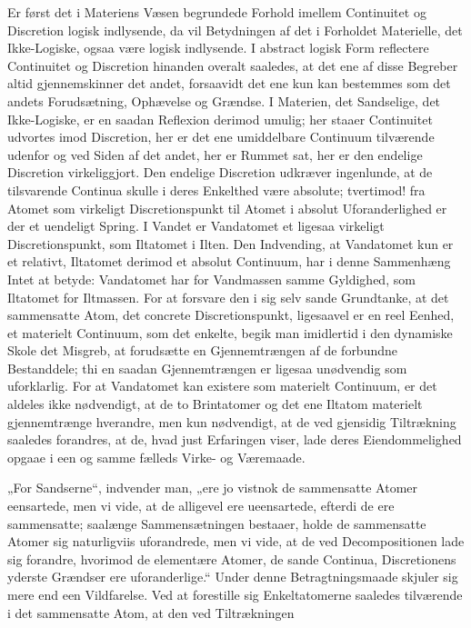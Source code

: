 \documentclass[12pt,a4paper]{book}
\begin{document}
Er først det i Materiens Væsen begrundede Forhold
imellem Continuitet og Discretion logisk indlysende, da vil
Betydningen af det i Forholdet Materielle, det Ikke-Logiske,
ogsaa være logisk indlysende. I abstract logisk Form reflectere
Continuitet og Discretion hinanden overalt saaledes, at det
ene af disse Begreber altid gjennemskinner det andet,
forsaavidt det ene kun kan bestemmes som det andets
Forudsætning, Ophævelse og Grændse. I Materien, det Sandselige,
det Ikke-Logiske, er en saadan Reflexion derimod umulig;
her staaer Continuitet udvortes imod Discretion, her er det
ene umiddelbare Continuum tilværende udenfor og ved Siden
af det andet, her er Rummet sat, her er den endelige
Discretion virkeliggjort. Den endelige Discretion udkræver
ingenlunde, at de tilsvarende Continua skulle i deres Enkelthed
være absolute; tvertimod! fra Atomet som virkeligt
Discretionspunkt til Atomet i absolut Uforanderlighed er der et
uendeligt Spring. I Vandet er Vandatomet et ligesaa
virkeligt Discretionspunkt, som Iltatomet i Ilten. Den
Indvending, at Vandatomet kun er et relativt, Iltatomet derimod
et absolut Continuum, har i denne Sammenhæng Intet at
betyde: Vandatomet har for Vandmassen samme Gyldighed,
som Iltatomet for Iltmassen. For at forsvare den i sig selv
sande Grundtanke, at det sammensatte Atom, det concrete
Discretionspunkt, ligesaavel er en reel Eenhed, et materielt
Continuum, som det enkelte, begik man imidlertid i den
dynamiske Skole det Misgreb, at forudsætte en
Gjennemtrængen af de forbundne Bestanddele; thi en saadan
Gjennemtrængen er ligesaa unødvendig som uforklarlig. For at
Vandatomet kan existere som materielt Continuum, er det
aldeles ikke nødvendigt, at de to Brintatomer og det ene
Iltatom materielt gjennemtrænge hverandre, men kun nødvendigt,
at de ved gjensidig Tiltrækning saaledes forandres, at de,
hvad just Erfaringen viser, lade deres Eiendommelighed
opgaae i een og samme fælleds Virke- og Væremaade.

„For Sandserne“, indvender man, „ere jo vistnok de
sammensatte Atomer eensartede, men vi vide, at de alligevel
ere ueensartede, efterdi de ere sammensatte; saalænge
Sammensætningen bestaaer, holde de sammensatte Atomer sig
naturligviis uforandrede, men vi vide, at de ved Decompositionen
lade sig forandre, hvorimod de elementære Atomer, de sande
Continua, Discretionens yderste Grændser ere uforanderlige.“
Under denne Betragtningsmaade skjuler sig mere end een
Vildfarelse. Ved at forestille sig Enkeltatomerne saaledes
tilværende i det sammensatte Atom, at den ved Tiltrækningen
\end{document}
